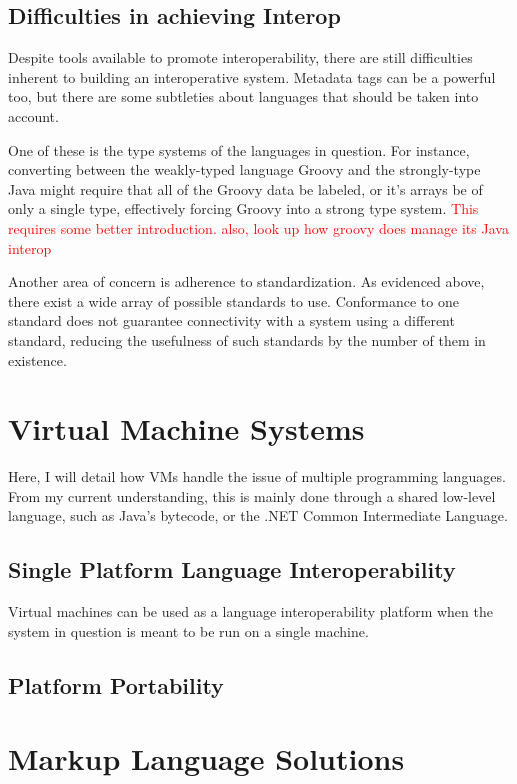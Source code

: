 \documentclass{sig-alternate}
\newcommand{\mycomment}[1]{\textcolor{red}{#1}}
\begin{document}
\subsection*{Difficulties in achieving Interop}
Despite tools available to promote interoperability, there are still difficulties inherent to building an interoperative system. Metadata tags can be a powerful too, but there are some subtleties about languages that should be taken into account.

One of these is the type systems of the languages in question. For instance, converting between the weakly-typed language Groovy and the strongly-type Java might require that all of the Groovy data be labeled, or it's arrays be of only a single type, effectively forcing Groovy into a strong type system. \mycomment{This requires some better introduction. also, look up how groovy does manage its Java interop}

Another area of concern is adherence to standardization.
As evidenced above, there exist a wide array of possible standards to use. Conformance to one standard does not guarantee connectivity with a system using a different standard, reducing the usefulness of such standards by the number of them in existence.\cite{?}



\section{Virtual Machine Systems}\label{VM}
Here, I will detail how VMs handle the issue of multiple programming languages.
From my current understanding, this is mainly done through a shared low-level language, such as Java's bytecode, or the .NET Common Intermediate Language.


\subsection*{Single Platform Language Interoperability}
Virtual machines can be used as a language interoperability platform when the system in question is meant to be run on a single machine. 

\subsection*{Platform Portability}


\section{Markup Language Solutions}\label{ML}
\end{document}
